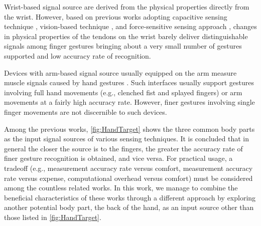\documentclass{sigchi}
\begin{document}
Wrist-based signal source are derived from the physical properties directly from the wrist.
However, based on previous works adopting capacitive sensing technique \cite{Rekimoto:2001:GGU:580581.856565}, vision-based technique \cite{Dementyev:2014:WLG:2642918.2647396}, and force-sensitive sensing approach \cite{Fukui:2011:HSC:2030112.2030154}, changes in physical properties of the tendons on the wrist barely deliver distinguishable signals among finger gestures bringing about a very small number of gestures supported and low accuracy rate of recognition.



Devices with arm-based signal source usually equipped on the arm measure muscle signals caused by hand gestures \cite{Myo} \cite{Saponas:2009:EAI:1622176.1622208}. Such interfaces usually support gestures involving full hand movements (e.g., clenched fist and splayed fingers) or arm movements at a fairly high accuracy rate. However, finer gestures involving single finger movements are not discernible to such devices.

Among the previous works, \autoref{fig:HandTarget} shows the three common body parts as the input signal sources of various sensing techniques. It is concluded that in general the closer the source is to the fingers, the greater the accuracy rate of finer gesture recognition is obtained, and vice versa. For practical usage, a tradeoff (e.g., measurement accuracy rate versus comfort, measurement accuracy rate versus expense, computational overhead versus comfort) must be considered among the countless related works. In this work, we manage to combine the beneficial characteristics of these works through a different approach by exploring another potential body part, the back of the hand, as an input source other than those listed in \autoref{fig:HandTarget}.
\end{document}
